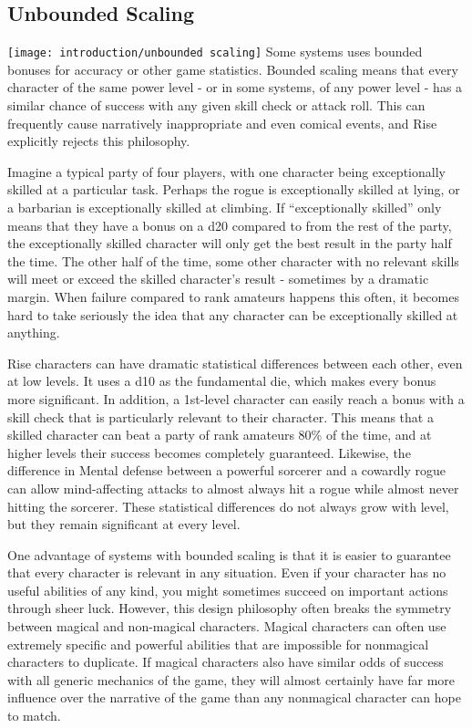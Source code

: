   \subsection{Unbounded Scaling}
    \texttt{[image: introduction/unbounded scaling]}
    Some systems uses bounded bonuses for accuracy or other game statistics.
    Bounded scaling means that every character of the same power level - or in some systems, of any power level - has a similar chance of success with any given skill check or attack roll.
    This can frequently cause narratively inappropriate and even comical events, and Rise explicitly rejects this philosophy.

    Imagine a typical party of four players, with one character being exceptionally skilled at a particular task.
    Perhaps the rogue is exceptionally skilled at lying, or a barbarian is exceptionally skilled at climbing.
    If ``exceptionally skilled'' only means that they have a  bonus on a d20 compared to  from the rest of the party, the exceptionally skilled character will only get the best result in the party half the time.
    The other half of the time, some other character with no relevant skills will meet or exceed the skilled character's result - sometimes by a dramatic margin.
    When failure compared to rank amateurs happens this often, it becomes hard to take seriously the idea that any character can be exceptionally skilled at anything.

    Rise characters can have dramatic statistical differences between each other, even at low levels.
    It uses a d10 as the fundamental die, which makes every bonus more significant.
    In addition, a 1st-level character can easily reach a  bonus with a skill check that is particularly relevant to their character.
    This means that a skilled character can beat a party of rank amateurs 80\% of the time, and at higher levels their success becomes completely guaranteed.
    Likewise, the difference in Mental defense between a powerful sorcerer and a cowardly rogue can allow mind-affecting attacks to almost always hit a rogue while almost never hitting the sorcerer.
    These statistical differences do not always grow with level, but they remain significant at every level.

    One advantage of systems with bounded scaling is that it is easier to guarantee that every character is relevant in any situation.
    Even if your character has no useful abilities of any kind, you might sometimes succeed on important actions through sheer luck.
    However, this design philosophy often breaks the symmetry between magical and non-magical characters.
    Magical characters can often use extremely specific and powerful abilities that are impossible for nonmagical characters to duplicate.
    If magical characters also have similar odds of success with all generic mechanics of the game, they will almost certainly have far more influence over the narrative of the game than any nonmagical character can hope to match.

